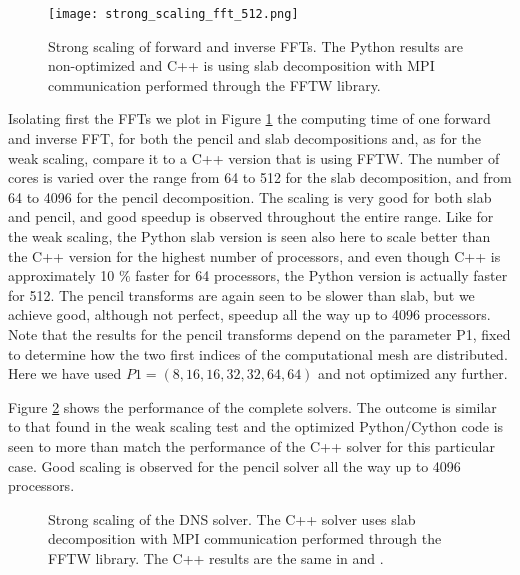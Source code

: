 \documentclass[final,3p,times,twocolumn]{elsarticle}
\begin{document}
\begin{figure}[ht!]
	\centering
	\texttt{[image: strong\_scaling\_fft\_512.png]}
	\caption{Strong scaling of forward and inverse FFTs. The Python results are 
	non-optimized and C++ is using slab 
		decomposition with MPI communication performed through the FFTW 
		library.}
	\label{fig:strong_FFT_scaling}
\end{figure}

Isolating first the FFTs we plot in Figure
\ref{fig:strong_FFT_scaling} the computing time of one forward and inverse FFT, for both the pencil and slab decompositions and, as for the weak scaling, compare it to a C++ version that is using FFTW. The number of
cores is varied over the range from 64 to 512 for the slab
decomposition, and from 64 to 4096 for the
pencil decomposition. The scaling is very good for both slab and pencil, and good speedup is observed
throughout the entire range. Like for the weak scaling, the Python slab version is seen also here to scale better than the C++ version for the highest number of processors, and even though C++ is approximately 10 \% faster for 64 processors, the Python version is actually faster for 512. The pencil transforms are again seen to be slower than slab, but we achieve good, although not perfect, speedup all the way up to 4096 processors. Note that the results for the pencil transforms depend on the parameter P1, fixed to determine how the two first indices of the computational mesh are distributed. Here we have used $P1 = (8, 16, 16, 32, 32, 64, 64)$ and not optimized any further.

Figure \ref{fig:Strong_scaling} shows the performance of the complete solvers. The outcome is similar to that found in the weak scaling test and the optimized Python/Cython code is seen
to more than match the performance of the C++ solver for this particular
case. Good scaling is observed for the pencil solver all the way up to 4096 processors.

\begin{figure}[ht!]
\caption{Strong scaling of the  DNS solver. The C++ solver uses slab decomposition with MPI communication performed through the FFTW library. The C++ results are the same in  and .}
\label{fig:Strong_scaling}
\end{figure}
\end{document}
